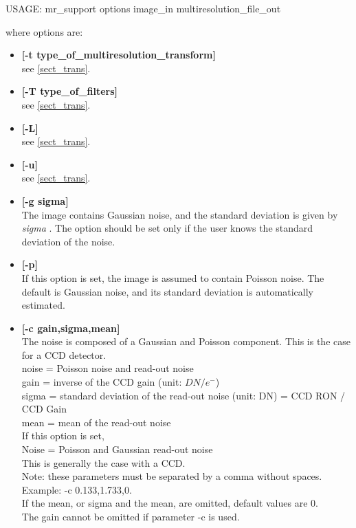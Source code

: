 \begin{center}
 USAGE: mr\_support options image\_in multiresolution\_file\_out
\end{center}
 where options are:
\begin{itemize}
\baselineskip=0.4truecm
\itemsep=0.1truecm
\item {\bf [-t type\_of\_multiresolution\_transform]} \\
  see \ref{sect_trans}.
\item {\bf [-T type\_of\_filters]}  \\
  see \ref{sect_trans}.
\item {\bf [-L]} \\
  see \ref{sect_trans}.
\item {\bf [-u]} \\
  see \ref{sect_trans}.
\item {\bf [-g sigma]} \\
 The image contains Gaussian noise, and the standard deviation is
given by {\em sigma }. The option should be set only if the user
knows the standard deviation of the noise. 
\item {\bf [-p]} \\
 If this option is set, the image is assumed to contain Poisson noise.
 The default is Gaussian noise, and its standard 
 deviation is automatically estimated. 
\item {\bf [-c gain,sigma,mean]} \\
The noise is composed of a Gaussian and Poisson component.  This is the 
case for a CCD detector. \\
noise = Poisson noise and read-out noise \\
gain = inverse of the CCD gain (unit: $DN/e^{-}$) \\
sigma = standard deviation of the read-out noise (unit: DN) = CCD RON / CCD Gain\\
mean = mean of the read-out noise \\
If this option is set, \\
Noise = Poisson and Gaussian read-out noise \\
This is generally the case with a CCD. \\
Note: these parameters must be separated by a comma without spaces. \\
Example: -c 0.133,1.733,0. \\
If the mean, or sigma and the mean, are omitted, default values are 0. \\
The gain cannot be omitted if parameter -c is used.

\end{itemize}
